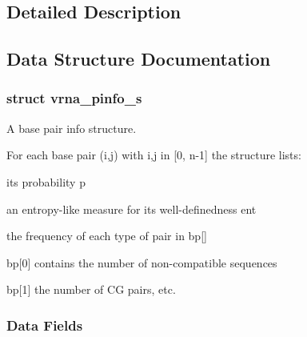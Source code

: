 \subsection{Detailed Description}


\subsection{Data Structure Documentation}
\label{structvrna__pinfo__s}
\hypertarget{group__aln__utils_structvrna__pinfo__s}{}
\subsubsection{struct vrna\+\_\+pinfo\+\_\+s}
A base pair info structure. 

For each base pair (i,j) with i,j in \mbox{[}0, n-\/1\mbox{]} the structure lists\+:
\begin{DoxyItemize}
\item its probability \textquotesingle{}p\textquotesingle{}
\item an entropy-\/like measure for its well-\/definedness \textquotesingle{}ent\textquotesingle{}
\item the frequency of each type of pair in \textquotesingle{}bp\mbox{[}\mbox{]}\textquotesingle{}
\begin{DoxyItemize}
\item \textquotesingle{}bp\mbox{[}0\mbox{]}\textquotesingle{} contains the number of non-\/compatible sequences
\item \textquotesingle{}bp\mbox{[}1\mbox{]}\textquotesingle{} the number of C\+G pairs, etc. 
\end{DoxyItemize}
\end{DoxyItemize}\subsubsection*{Data Fields}
